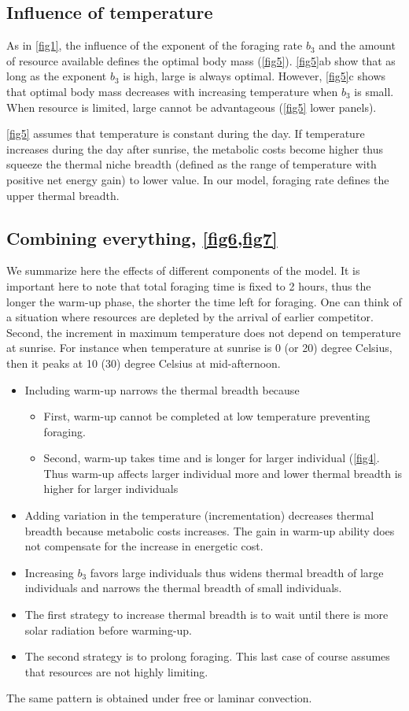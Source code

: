 \subsection*{Influence of temperature}
As in \cref{fig1}, the influence of the exponent of the foraging rate $b_3$ and the amount of resource available defines the optimal body mass (\cref{fig5}).
\cref{fig5}ab show that as long as the exponent $b_3$ is high, large is always optimal.
However, \cref{fig5}c shows that optimal body mass decreases with increasing temperature when $b_3$ is small.
When resource is limited, large cannot be advantageous (\cref{fig5} lower panels).

\cref{fig5} assumes that temperature is constant during the day.
If temperature increases during the day after sunrise, the metabolic costs become higher thus squeeze the thermal niche breadth (defined as the range of temperature with positive net energy gain) to lower value.
In our model, foraging rate defines the upper thermal breadth.

 \subsection*{Combining everything, \cref{fig6,fig7}}
 We summarize here the effects of different components of the model.
 It is important here to note that total foraging time is fixed to 2 hours, thus the longer the warm-up phase, the shorter the time left for foraging.
 One can think of a situation where resources are depleted by the arrival of earlier competitor.  
  Second, the increment in maximum temperature does not depend on temperature at sunrise. 
  For instance when temperature at sunrise is 0 (or 20) degree Celsius, then it peaks at 10 (30) degree Celsius at mid-afternoon.
 \begin{itemize}
 	\item Including warm-up narrows the thermal breadth because
 	\begin{itemize}
	 	\item First, warm-up cannot be completed at low temperature preventing foraging.	
  		\item Second, warm-up takes time and is longer for larger individual (\cref{fig4}. Thus warm-up affects larger individual more and lower thermal breadth is higher for larger individuals
	\end{itemize}  
	\item Adding variation in the temperature (incrementation) decreases thermal breadth because metabolic costs increases. 
	The gain in warm-up ability does not compensate for the increase in energetic cost.
	\item Increasing $b_3$ favors large individuals thus widens thermal breadth of large individuals and narrows the thermal breadth of small individuals.
	\item The first strategy to increase thermal breadth is to wait until there is more solar radiation before warming-up.
	\item The second strategy is to prolong foraging. 
	This last case of course assumes that resources are not highly limiting.
\end{itemize}  
The same pattern is obtained under free or laminar convection. 

